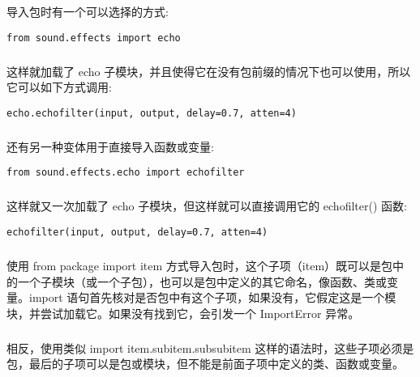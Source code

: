 \documentclass{article}
\begin{document}
\begin{CJK}{UTF8}{gbsn}
导入包时有一个可以选择的方式:
\begin{verbatim}
from sound.effects import echo
\end{verbatim}
\subparagraph*{}
这样就加载了 echo 子模块，并且使得它在没有包前缀的情况下也可以使用，所以它可以如下方式调用:
\begin{verbatim}
echo.echofilter(input, output, delay=0.7, atten=4)
\end{verbatim}
\subparagraph*{}
还有另一种变体用于直接导入函数或变量:
\begin{verbatim}
from sound.effects.echo import echofilter
\end{verbatim}
\subparagraph*{}
这样就又一次加载了 echo 子模块，但这样就可以直接调用它的 echofilter() 函数:
\begin{verbatim}
echofilter(input, output, delay=0.7, atten=4)
\end{verbatim}
\subparagraph*{}
使用 from package import item 方式导入包时，这个子项（item）既可以是包中的一个子模块（或一个子包），也可以是包中定义的其它命名，像函数、类或变量。import 语句首先核对是否包中有这个子项，如果没有，它假定这是一个模块，并尝试加载它。如果没有找到它，会引发一个 ImportError 异常。
\subparagraph*{}
相反，使用类似 import item.subitem.subsubitem 这样的语法时，这些子项必须是包，最后的子项可以是包或模块，但不能是前面子项中定义的类、函数或变量。

\end{CJK}
\end{document}

